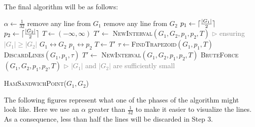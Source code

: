 \documentclass{article}
\renewcommand{\And}{\textbf{and} }
\DeclarePairedDelimiter\ceil{\lceil}{\rceil}
\begin{document}
The final algorithm will be as follows:


\begin{algorithm}
\begin{algorithmic}[1]
\State $\alpha \gets \frac{1}{32}$
 remove any line from $G_1$
\EndIf
{} remove any line from $G_2$
\EndIf
\State $p_1 \gets \ceil{\frac{|G_1|}{2}}$
\State $p_2 \gets \ceil{\frac{|G_2|}{2}}$
\State $T \gets (-\infty,\infty)$
\State $T' \gets$ \textsc{NewInterval}$(G_1,G_2,p_1,p_2,T)$
\While{${|G_1|\choose 2}>\frac{1}{\alpha} \ \And \ {|G_2|\choose 2}>\frac{1}{\alpha}$}
 \hfill {\small \textcolor{gray}{$\rhd$ ensuring $|G_1|\geq|G_2|$}}
\State $G_1\leftrightarrow G_2$
\State $p_1\leftrightarrow p_2$
\EndIf
\State $T \gets T'$
\State $\tau \gets $\textsc{FindTrapezoid}$(G_1,p_1,T)$
\State \textsc{DiscardLines}$(G_1,p_1,\tau)$
\State $T' \gets$ \textsc{NewInterval}$(G_1,G_2,p_1,p_2,T)$
\EndWhile
\State \Return \textsc{BruteForce}$(G_1,G_2,p_1,p_2,T)$ \hfill {\small \textcolor{gray}{$\rhd$ $|G_1|$ and $|G_2|$ are sufficiently small}}
\end{algorithmic}
\caption{\textsc{HamSandwichPoint}($G_1,G_2$)}
\label{ham_sandwich_point_algorithm}
\end{algorithm}

The following figures represent what one of the phases of the algorithm might look like. Here we use an $\alpha$ greater than $\frac{1}{32}$ to make it easier to visualize the lines. As a consequence, less than half the lines will be discarded in Step 3.
\end{document}
